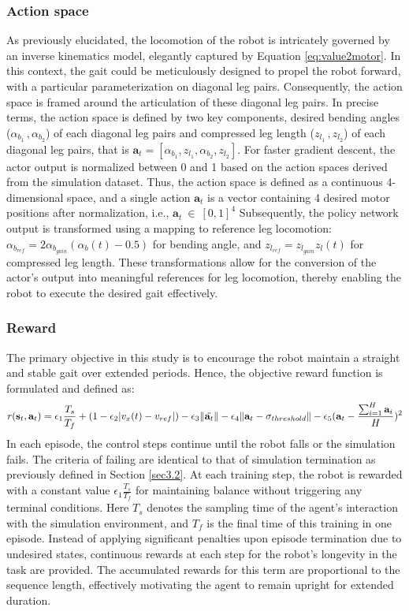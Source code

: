 \subsubsection{Action space}
\label{Sec:as}
As previously elucidated, the locomotion of the robot is intricately governed by an inverse kinematics model, elegantly captured by Equation \ref{eq:value2motor}. In this context, the gait could be meticulously designed to propel the robot forward, with a particular parameterization on diagonal leg pairs. Consequently, the action space is framed around the articulation of these diagonal leg pairs. In precise terms, the action space is defined by two key components, desired bending angles ($\alpha_{b_1}\,,\alpha_{b_2}$) of each diagonal leg pairs and compressed leg length ($z_{l_1}\,,z_{l_2}$) of each diagonal leg pairs, that is $\mathbf{a}_{t} = [\alpha_{b_1}, z_{l_1}, \alpha_{b_2}, z_{l_2}]$. For faster gradient descent, the actor output is normalized between 0 and 1 based on the action spaces derived from the simulation dataset. Thus, the action space is defined as a continuous 4-dimensional space, and a single action $\mathbf{a}_t$ is a vector containing 4 desired motor positions after normalization, i.e., $\mathbf{a}_t \:\in\:[0,1]^4$ Subsequently, the policy network output is transformed using a mapping to reference leg locomotion: $\alpha_{b_{ref}} = 2\alpha_{b_{gain}}(\alpha_b(t) -0.5)$ for bending angle, and $z_{l_{ref}} = z_{l_{gain}}z_l(t)$ for compressed leg length. These transformations allow for the conversion of the actor's output into meaningful references for leg locomotion, thereby enabling the robot to execute the desired gait effectively.
\subsubsection{Reward}
The primary objective in this study is to encourage the robot maintain a straight and stable gait over extended periods. Hence, the objective reward function is formulated and defined as: 
\begin{equation}
    r(\mathbf{s}_t,\mathbf{a}_t) = \epsilon_1\frac{T_s}{T_f} + (1-\epsilon_2|v_x(t)-v_{ref}|)-\epsilon_3\lVert\Ddot{\mathbf{a}_t}\rVert - \epsilon_4\lVert\mathbf{a}_t-\mathbf{\sigma}_{threshold}\rVert - \epsilon_5(\mathbf{a}_t-\frac{\sum_{i=1}^{H}\mathbf{a}_i}{H})^2
    \label{eq:reward}
\end{equation}
In each episode, the control steps continue until the robot falls or the simulation fails. The criteria of failing are identical to that of simulation termination as previously defined in Section \ref{sec3.2}. At each training step, the robot is rewarded with a constant value $\epsilon_1\frac{T_s}{T_f}$ for maintaining balance without triggering any terminal conditions. Here $T_s$ denotes the sampling time of the agent's interaction with the simulation environment, and $T_f$ is the final time of this training in one episode. Instead of applying significant penalties upon episode termination due to undesired states, continuous rewards at each step for the robot's longevity in the task are provided. The accumulated rewards for this term are proportional to the sequence length, effectively motivating the agent to remain upright for extended duration. 


